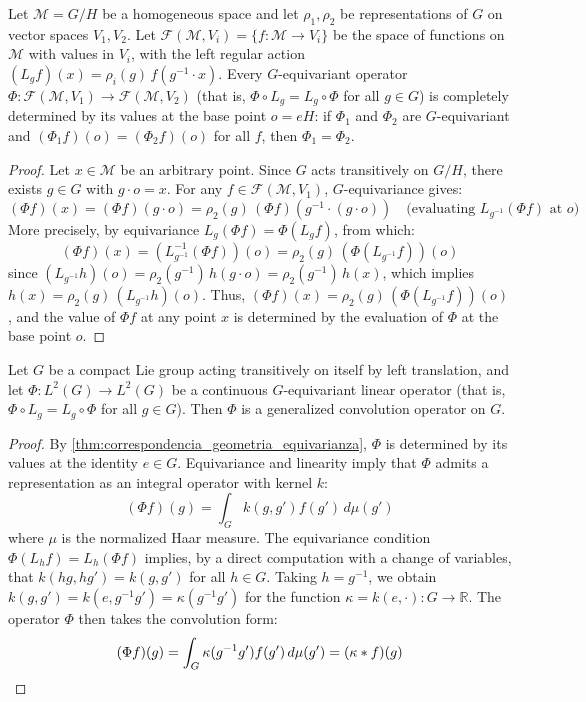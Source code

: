 \begin{theorem}\label{thm:correspondencia_geometria_equivarianza}
Let $\mathcal{M} = G/H$ be a homogeneous space and let $\rho_1, \rho_2$ be representations of $G$ on vector spaces $V_1, V_2$. Let $\mathcal{F}(\mathcal{M}, V_i) = \{f: \mathcal{M} \to V_i\}$ be the space of functions on $\mathcal{M}$ with values in $V_i$, with the left regular action $(L_g f)(x) = \rho_i(g)\, f(g^{-1} \cdot x)$. Every $G$-equivariant operator $\Phi: \mathcal{F}(\mathcal{M}, V_1) \to \mathcal{F}(\mathcal{M}, V_2)$ (that is, $\Phi \circ L_g = L_g \circ \Phi$ for all $g \in G$) is completely determined by its values at the base point $o = eH$: if $\Phi_1$ and $\Phi_2$ are $G$-equivariant and $(\Phi_1 f)(o) = (\Phi_2 f)(o)$ for all $f$, then $\Phi_1 = \Phi_2$.
\end{theorem}

\begin{proof}
Let $x \in \mathcal{M}$ be an arbitrary point. Since $G$ acts transitively on $G/H$, there exists $g \in G$ with $g \cdot o = x$. For any $f \in \mathcal{F}(\mathcal{M}, V_1)$, $G$-equivariance gives:
\[
(\Phi f)(x) = (\Phi f)(g \cdot o) = \rho_2(g)\,(\Phi f)(g^{-1} \cdot (g \cdot o)) \quad \text{(evaluating } L_{g^{-1}}(\Phi f) \text{ at } o\text{)}
\]
More precisely, by equivariance $L_g(\Phi f) = \Phi(L_g f)$, from which:
\[
(\Phi f)(x) = (L_{g^{-1}}^{-1}(\Phi f))(o) = \rho_2(g)\,(\Phi(L_{g^{-1}} f))(o)
\]
since $(L_{g^{-1}} h)(o) = \rho_2(g^{-1})\,h(g \cdot o) = \rho_2(g^{-1})\,h(x)$, which implies $h(x) = \rho_2(g)\,(L_{g^{-1}} h)(o)$. Thus, $(\Phi f)(x) = \rho_2(g)\,(\Phi(L_{g^{-1}} f))(o)$, and the value of $\Phi f$ at any point $x$ is determined by the evaluation of $\Phi$ at the base point $o$.
\end{proof}

\begin{corollary}\label{cor:operadores_equivariantes}
Let $G$ be a compact Lie group acting transitively on itself by left translation, and let $\Phi: L^2(G) \to L^2(G)$ be a continuous $G$-equivariant linear operator (that is, $\Phi \circ L_g = L_g \circ \Phi$ for all $g \in G$). Then $\Phi$ is a generalized convolution operator on $G$.
\end{corollary}

\begin{proof}
By \autoref{thm:correspondencia_geometria_equivarianza}, $\Phi$ is determined by its values at the identity $e \in G$. Equivariance and linearity imply that $\Phi$ admits a representation as an integral operator with kernel $k$:
\[
(\Phi f)(g) = \int_{G} k(g, g') f(g')\, d\mu(g')
\]
where $\mu$ is the normalized Haar measure. The equivariance condition $\Phi(L_h f) = L_h(\Phi f)$ implies, by a direct computation with a change of variables, that $k(hg, hg') = k(g, g')$ for all $h \in G$. Taking $h = g^{-1}$, we obtain $k(g, g') = k(e, g^{-1}g') = \kappa(g^{-1}g')$ for the function $\kappa = k(e, \cdot): G \to \mathbb{R}$. The operator $\Phi$ then takes the convolution form:
\[
(\Phi f)(g) = \int_{G} \kappa(g^{-1}g') f(g')\, d\mu(g') = (\kappa * f)(g) \qedhere
\]
\end{proof}

